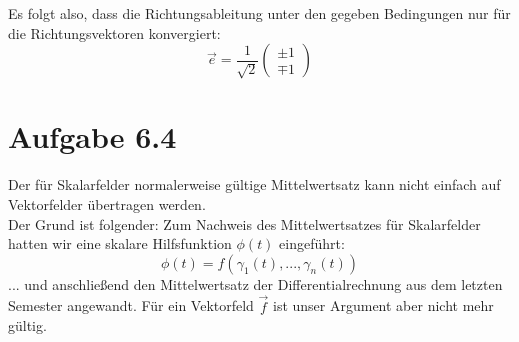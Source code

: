 \documentclass[a4paper,german,12pt,smallheadings]{scrartcl}
\begin{document}
\begin{enumerate}[(1)]
Es folgt also, dass die Richtungsableitung unter den gegeben Bedingungen nur für die Richtungsvektoren konvergiert:
\begin{equation*}
\vec{e}=\frac{1}{\sqrt{2}}\begin{pmatrix}
\pm1\\\mp1
\end{pmatrix}
\end{equation*}

\end{enumerate}

\section*{Aufgabe 6.4}
Der für Skalarfelder normalerweise gültige Mittelwertsatz kann nicht einfach auf Vektorfelder übertragen werden.\\
Der Grund ist folgender: Zum Nachweis des Mittelwertsatzes für Skalarfelder hatten wir eine skalare Hilfsfunktion $\phi(t)$ eingeführt:
\begin{equation*}
\phi(t)=f\left(\gamma_1(t),...,\gamma_n(t)\right)
\end{equation*}
... und anschließend den Mittelwertsatz der Differentialrechnung aus dem letzten Semester angewandt. Für ein Vektorfeld $\vec{f}$ ist unser Argument aber nicht mehr gültig.\\
\end{document}
